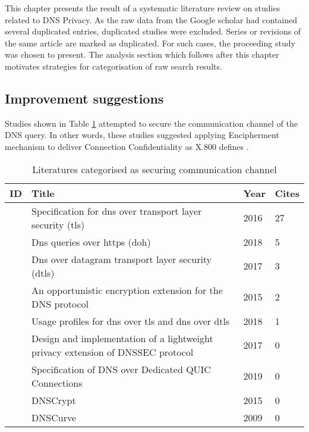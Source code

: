 This chapter presents the result of a systematic literature review on studies related to DNS Privacy.
As the raw data from the Google scholar had contained several duplicated entries, duplicated studies were excluded. Series or revisions of the same article are marked as duplicated. For such cases, the proceeding study was chosen to present.
The analysis section which follows after this chapter motivates strategies for categorisation of raw search results.

\subsection{Improvement suggestions}
Studies shown in Table \ref{channel} attempted to secure the communication channel of the DNS query. In other words, these studies suggested applying Encipherment mechanism to deliver Connection Confidentiality as X.800 defines \cite{x800}.

\begin{table}[h!]
    \begin{tabular}{ | l | p{10.5cm} | l | l | }
        \hline
            ID & Title & Year & Cites  \\ \hline
            \cite{hu2016specification} & Specification for dns over transport layer security (tls) & 2016 & 27 \\ \hline
            \cite{rfc8484} & Dns queries over https (doh) & 2018 & 5\\ \hline
            \cite{reddy2017dns} & Dns over datagram transport layer security (dtls) & 2017 & 3\\ \hline
            \cite{bucuti2015opportunistic} & An opportunistic encryption extension for the DNS protocol & 2015 & 2 \\ \hline
            \cite{dickinson2018usage} & Usage profiles for dns over tls and dns over dtls & 2018 & 1 \\ \hline
            \cite{saraj2017design} & Design and implementation of a lightweight privacy extension of DNSSEC protocol & 2017 & 0 \\ \hline
            \cite{dnsoquic} & Specification of DNS over Dedicated QUIC Connections & 2019 & 0 \\ \hline
            \cite{denis2015dnscrypt} & DNSCrypt & 2015 & 0 \\ \hline
            \cite{dempsky2010dnscurve} & DNSCurve & 2009 & 0 \\ \hline
        \end{tabular}
        \caption{Literatures categorised as securing communication channel}
\label{channel}
\end{table}

